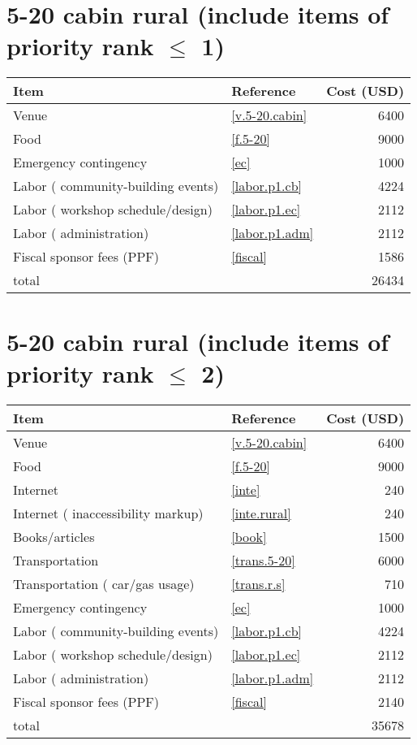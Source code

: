 \section*{5-20 cabin rural (include items of priority rank $\leq$ 1)}
\begin{center}
\begin{tabular}{llr}
Item & Reference & Cost (USD) \\ \hline
Venue & \ref{v.5-20.cabin} & 6400 \\
Food & \ref{f.5-20} & 9000 \\
Emergency contingency & \ref{ec} & 1000 \\
Labor ( community-building events) & \ref{labor.p1.cb} & 4224 \\
Labor ( workshop schedule/design) & \ref{labor.p1.ec} & 2112 \\
Labor ( administration) & \ref{labor.p1.adm} & 2112 \\
Fiscal sponsor fees (PPF) & \ref{fiscal} & 1586 \\ \hline
total &  & 26434
\end{tabular}
\end{center}
\newpage
\section*{5-20 cabin rural (include items of priority rank $\leq$ 2)}
\begin{center}
\begin{tabular}{llr}
Item & Reference & Cost (USD) \\ \hline
Venue & \ref{v.5-20.cabin} & 6400 \\
Food & \ref{f.5-20} & 9000 \\
Internet & \ref{inte} & 240 \\
Internet ( inaccessibility markup) & \ref{inte.rural} & 240 \\
Books/articles & \ref{book} & 1500 \\
Transportation & \ref{trans.5-20} & 6000 \\
Transportation ( car/gas usage) & \ref{trans.r.s} & 710 \\
Emergency contingency & \ref{ec} & 1000 \\
Labor ( community-building events) & \ref{labor.p1.cb} & 4224 \\
Labor ( workshop schedule/design) & \ref{labor.p1.ec} & 2112 \\
Labor ( administration) & \ref{labor.p1.adm} & 2112 \\
Fiscal sponsor fees (PPF) & \ref{fiscal} & 2140 \\ \hline
total &  & 35678
\end{tabular}
\end{center}
\newpage
